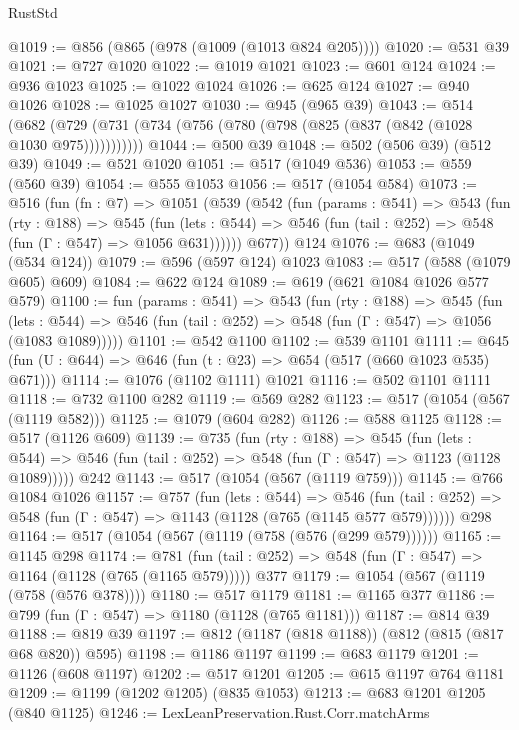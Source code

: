 \begin{lexlean}{RustStd}
\begin{coremodule}
@1019 := @856 (@865 (@978 (@1009 (@1013 @824 @205))))
@1020 := @531 @39
@1021 := @727 @1020
@1022 := @1019 @1021
@1023 := @601 @124
@1024 := @936 @1023
@1025 := @1022 @1024
@1026 := @625 @124
@1027 := @940 @1026
@1028 := @1025 @1027
@1030 := @945 (@965 @39)
@1043 := @514
    (@682 (@729 (@731 (@734 (@756 (@780 (@798 (@825 (@837 (@842 (@1028 @1030 @975)))))))))))
@1044 := @500 @39
@1048 := @502 (@506 @39) (@512 @39)
@1049 := @521 @1020
@1051 := @517 (@1049 @536)
@1053 := @559 (@560 @39)
@1054 := @555 @1053
@1056 := @517 (@1054 @584)
@1073 := @516
    (fun (fn : @7) =>
    @1051
      (@539
        (@542
          (fun (params : @541) =>
          @543
            (fun (rty : @188) =>
            @545
              (fun (lets : @544) =>
              @546 (fun (tail : @252) => @548 (fun (Γ : @547) => @1056 @631))))))
        @677))
    @124
@1076 := @683 (@1049 (@534 @124))
@1079 := @596 (@597 @124) @1023
@1083 := @517 (@588 (@1079 @605) @609)
@1084 := @622 @124
@1089 := @619 (@621 @1084 @1026 @577 @579)
@1100 := fun (params : @541) =>
  @543
    (fun (rty : @188) =>
    @545
      (fun (lets : @544) =>
      @546 (fun (tail : @252) => @548 (fun (Γ : @547) => @1056 (@1083 @1089)))))
@1101 := @542 @1100
@1102 := @539 @1101
@1111 := @645 (fun (U : @644) => @646 (fun (t : @23) => @654 (@517 (@660 @1023 @535) @671)))
@1114 := @1076 (@1102 @1111) @1021
@1116 := @502 @1101 @1111
@1118 := @732 @1100 @282
@1119 := @569 @282
@1123 := @517 (@1054 (@567 (@1119 @582)))
@1125 := @1079 (@604 @282)
@1126 := @588 @1125
@1128 := @517 (@1126 @609)
@1139 := @735
    (fun (rty : @188) =>
    @545
      (fun (lets : @544) =>
      @546 (fun (tail : @252) => @548 (fun (Γ : @547) => @1123 (@1128 @1089)))))
    @242
@1143 := @517 (@1054 (@567 (@1119 @759)))
@1145 := @766 @1084 @1026
@1157 := @757
    (fun (lets : @544) =>
    @546 (fun (tail : @252) => @548 (fun (Γ : @547) => @1143 (@1128 (@765 (@1145 @577 @579))))))
    @298
@1164 := @517 (@1054 (@567 (@1119 (@758 (@576 (@299 @579))))))
@1165 := @1145 @298
@1174 := @781 (fun (tail : @252) => @548 (fun (Γ : @547) => @1164 (@1128 (@765 (@1165 @579))))) @377
@1179 := @1054 (@567 (@1119 (@758 (@576 @378))))
@1180 := @517 @1179
@1181 := @1165 @377
@1186 := @799 (fun (Γ : @547) => @1180 (@1128 (@765 @1181)))
@1187 := @814 @39
@1188 := @819 @39
@1197 := @812 (@1187 (@818 @1188)) (@812 (@815 (@817 @68 @820)) @595)
@1198 := @1186 @1197
@1199 := @683 @1179
@1201 := @1126 (@608 @1197)
@1202 := @517 @1201
@1205 := @615 @1197 @764 @1181
@1209 := @1199 (@1202 @1205) (@835 @1053)
@1213 := @683 @1201 @1205 (@840 @1125)
@1246 := LexLeanPreservation.Rust.Corr.matchArms

\end{coremodule}
\end{lexlean}
